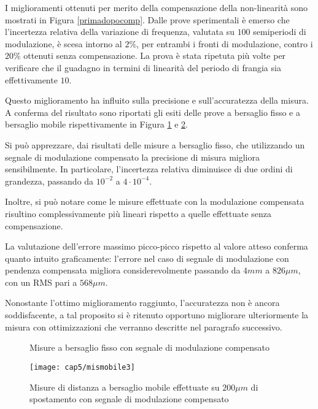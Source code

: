 I miglioramenti ottenuti per merito della compensazione della non-linearità sono mostrati in Figura \ref{primadopocomp}. Dalle prove sperimentali è emerso che l'incertezza relativa della variazione di frequenza, valutata su $100$ semiperiodi di modulazione, è scesa intorno al $2\%$, per entrambi i fronti di modulazione, contro i $20\%$ ottenuti senza compensazione. La prova è stata ripetuta più volte per verificare che il guadagno in termini di linearità del periodo di frangia sia effettivamente $10$.

Questo miglioramento ha influito sulla precisione e sull'accuratezza della misura. A conferma del risultato sono riportati gli esiti delle prove a bersaglio fisso e a bersaglio mobile rispettivamente in Figura \ref{misfisso3} e \ref{mismobile3}.

Si può apprezzare, dai risultati delle misure a bersaglio fisso, che utilizzando un segnale di modulazione compensato la precisione di misura migliora sensibilmente. In particolare, l'incertezza relativa diminuisce di due ordini di grandezza, passando da $10^{-2}$ a $4 \cdot 10^{-4}$.

Inoltre, si può notare come le misure effettuate con la modulazione compensata risultino complessivamente più lineari rispetto a quelle effettuate senza compensazione.

La valutazione dell'errore massimo picco-picco rispetto al valore atteso conferma quanto intuito graficamente: l'errore nel caso di segnale di modulazione con pendenza compensata migliora considerevolmente passando da $4mm$ a $826 \mu m$, con un RMS pari a $568 \mu m$.

Nonostante l'ottimo miglioramento raggiunto, l'accuratezza non è ancora soddisfacente, a tal proposito si è ritenuto opportuno migliorare ulteriormente la misura con ottimizzazioni che verranno descritte nel paragrafo successivo.
\begin{figure}[H]
	\centering
\end{figure}
\begin{figure}[H]
	\centering
	\caption{Misure a bersaglio fisso con segnale di modulazione compensato}\label{misfisso3}
\end{figure}

\begin{figure}[H]  
	\begin{center}
		\texttt{[image: cap5/mismobile3]}
		\caption{Misure di distanza a bersaglio mobile effettuate su $200\mu m$ di spostamento con segnale di modulazione compensato}
		\label{mismobile3}
	\end{center}
\end{figure}

